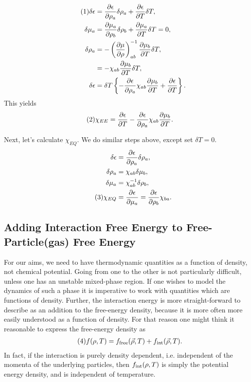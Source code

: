 \documentclass[12pt]{article}
\numberwithin{equation}{section}
\numberwithin{figure}{section}
\newcommand\eqnumber{\addtocounter{equation}{1}\tag{\theequation}}
\begin{document}
\begin{align*}\eqnumber
\delta\epsilon&=
\frac{\partial\epsilon}{\partial\rho_a}\delta\rho_a
+\frac{\partial\epsilon}{\partial T}\delta T,\\
\delta\mu_a&=\frac{\partial\mu_a}{\partial\rho_b}\delta\rho_b+\frac{\partial\mu_a}{\partial T}\delta T=0,\\
\delta\rho_a&=-\left(\frac{\partial\mu}{\partial\rho}\right)_{ab}^{-1}\frac{\partial\mu_b}{\partial T}\delta T,\\
&=-\chi_{ab}\frac{\partial\mu_b}{\partial T}\delta T,\\
\delta\epsilon&=\delta T\left\{
-\frac{\partial \epsilon}{\partial\rho_a}\chi_{ab}\frac{\partial\mu_b}{\partial T}+\frac{\partial\epsilon}{\partial T}
\right\}.
\end{align*}
This yields
\begin{align*}\eqnumber\label{eq:chiEE}
\chi_{EE}&=\frac{\partial\epsilon}{\partial T}
-\frac{\partial\epsilon}{\partial\rho_a}\chi_{ab}\frac{\partial\mu_b}{\partial T}.
\end{align*}

Next, let's calculate $\chi_{EQ}$. We do similar steps above, except set $\delta T=0$.
\begin{align*}
\delta\epsilon&=\frac{\partial\epsilon}{\partial\rho_a}\delta\rho_a,\\
\delta\rho_a&=\chi_{ab}\delta\mu_b,\\
\delta\mu_a&=\chi^{-1}_{ab}\delta\rho_b,\\
\eqnumber\label{eq:chiEQ}
\chi_{EQ}&=\frac{\partial\epsilon}{\partial\mu_a}=\frac{\partial\epsilon}{\partial\rho_b}\chi_{ba}.
\end{align*}

\subsection{Adding Interaction Free Energy to Free-Particle(gas) Free Energy}

For our aims, we need to have thermodynamic quantities as a function of density, not chemical potential. Going from one to the other is not particularly difficult, unless one has an unstable mixed-phase region. If one wishes to model the dynamics of such a phase it is imperative to work with quantities which are functions of density. Further, the interaction energy is more straight-forward to describe as an addition to the free-energy density, because it is more often more easily understood as a function of density. For that reason one might think it reasonable to express the free-energy density as
\begin{align*}\eqnumber
f(\rho,T)&=f_{\rm free}(\vec{\rho},T)+f_{\rm int}(\vec{\rho},T).
\end{align*}
In fact, if the interaction is purely density dependent, i.e. independent of the momenta of the underlying particles, then $f_{\rm int}(\rho,T)$ is simply the potential energy density, and is independent of temperature.
\end{document}
